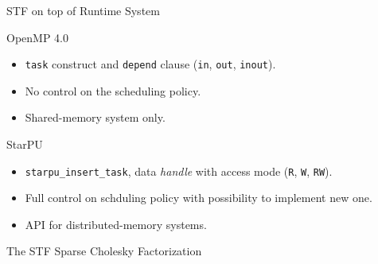 \documentclass{beamer}
\begin{document}
\begin{frame}{STF on top of Runtime System}

  \alert{OpenMP 4.0}
  \begin{itemize}
  \item \texttt{task} construct and \texttt{depend} clause (\texttt{in}, \texttt{out},
    \texttt{inout}).
  \item No control on the scheduling policy.
  \item Shared-memory system only.
  \end{itemize}

  \vspace{0.5cm}

  \alert{StarPU}
  \begin{itemize}
  \item \texttt{starpu\_insert\_task}, data \textit{handle} with
    access mode (\texttt{R}, \texttt{W}, \texttt{RW}).
  \item Full control on schduling policy with possibility to implement
    new one.
  \item API for distributed-memory systems.
  \end{itemize}
  
\end{frame}

\begin{frame}[fragile,t]{The STF Sparse Cholesky Factorization}
  
\end{frame}
\end{document}
